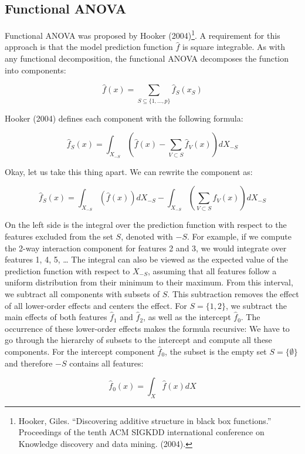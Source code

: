 \documentclass[
  10pt,
]{scrbook}
\begin{document}
\hypertarget{functional-anova}{%
\subsection{Functional ANOVA}\label{functional-anova}}

Functional ANOVA was proposed by Hooker (2004)\footnote{Hooker, Giles. ``Discovering additive structure in black box functions.'' Proceedings of the tenth ACM SIGKDD international conference on Knowledge discovery and data mining. (2004).}.
A requirement for this approach is that the model prediction function \(\hat{f}\) is square integrable.
As with any functional decomposition, the functional ANOVA decomposes the function into components:

\[\hat{f}(x) = \sum_{S\subseteq\{1,\ldots,p\}} \hat{f}_S(x_S)\]

Hooker (2004) defines each component with the following formula:

\[\hat{f}_S(x) = \int_{X_{-S}} \left( \hat{f}(x) - \sum_{V \subset S} \hat{f}_V(x)\right) d X_{-S}\]

Okay, let us take this thing apart.
We can rewrite the component as:

\[\hat{f}_S(x) = \int_{X_{-S}} \left( \hat{f}(x)\right) d X_{-S} - \int_{X_{-S}} \left(\sum_{V \subset S} \hat{f}_V(x) \right) d X_{-S}\]

On the left side is the integral over the prediction function with respect to the features excluded from the set \(S\), denoted with \(-S\).
For example, if we compute the 2-way interaction component for features 2 and 3, we would integrate over features 1, 4, 5, \ldots{}
The integral can also be viewed as the expected value of the prediction function with respect to \(X_{-S}\), assuming that all features follow a uniform distribution from their minimum to their maximum.
From this interval, we subtract all components with subsets of \(S\).
This subtraction removes the effect of all lower-order effects and centers the effect.
For \(S=\{1,2\}\), we subtract the main effects of both features \(\hat{f}_1\) and \(\hat{f}_2\), as well as the intercept \(\hat{f}_0\).
The occurrence of these lower-order effects makes the formula recursive:
We have to go through the hierarchy of subsets to the intercept and compute all these components.
For the intercept component \(\hat{f}_0\), the subset is the empty set \(S=\{\emptyset\}\) and therefore \(-S\) contains all features:

\[\hat{f}_0(x) = \int_{X} \hat{f}(x) dX\]
\end{document}
